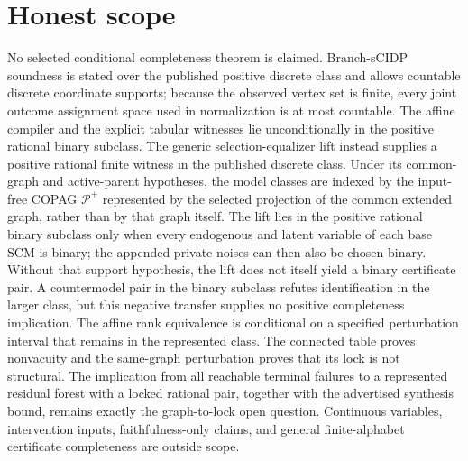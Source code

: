 \documentclass{article}
\begin{document}
\section{Honest scope}

No selected conditional completeness theorem is claimed. Branch-sCIDP soundness is stated over the published positive discrete class and allows countable discrete coordinate supports; because the observed vertex set is finite, every joint outcome assignment space used in normalization is at most countable. The affine compiler and the explicit tabular witnesses lie unconditionally in the positive rational binary subclass. The generic selection-equalizer lift instead supplies a positive rational finite witness in the published discrete class. Under its common-graph and active-parent hypotheses, the model classes are indexed by the input-free COPAG \(\mathcal P^+\) represented by the selected projection of the common extended graph, rather than by that graph itself. The lift lies in the positive rational binary subclass only when every endogenous and latent variable of each base SCM is binary; the appended private noises can then also be chosen binary. Without that support hypothesis, the lift does not itself yield a binary certificate pair. A countermodel pair in the binary subclass refutes identification in the larger class, but this negative transfer supplies no positive completeness implication. The affine rank equivalence is conditional on a specified perturbation interval that remains in the represented class. The connected table proves nonvacuity and the same-graph perturbation proves that its lock is not structural. The implication from all reachable terminal failures to a represented residual forest with a locked rational pair, together with the advertised synthesis bound, remains exactly the graph-to-lock open question. Continuous variables, intervention inputs, faithfulness-only claims, and general finite-alphabet certificate completeness are outside scope.
\end{document}

